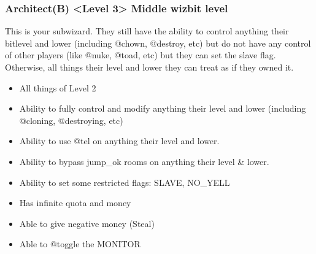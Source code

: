 \documentclass[letterpaper,10pt,english]{sphinxmanual}
\begin{document}
\subsubsection{Architect(B) \textless{}Level 3\textgreater{} \sphinxhyphen{} Middle wizbit level}
\label{\detokenize{toggles:architect-b-level-3-middle-wizbit-level}}
\sphinxAtStartPar
This is your sub\sphinxhyphen{}wizard.  They still have the ability to control
anything their bitlevel and lower (including @chown, @destroy, etc)
but do not have any control of other players (like @nuke, @toad, etc)
but they can set the slave flag.  Otherwise, all things their level
and lower they can treat as if they owned it.
\begin{itemize}
\item {} 
\sphinxAtStartPar
All things of Level 2

\item {} 
\sphinxAtStartPar
Ability to fully control and modify anything their level and lower (including @cloning, @destroying, etc)

\item {} 
\sphinxAtStartPar
Ability to use @tel on anything their level and lower.

\item {} 
\sphinxAtStartPar
Ability to bypass jump\_ok rooms on anything their level \& lower.

\item {} 
\sphinxAtStartPar
Ability to set some restricted flags: SLAVE, NO\_YELL

\item {} 
\sphinxAtStartPar
Has infinite quota and money

\item {} 
\sphinxAtStartPar
Able to give negative money (Steal)

\item {} 
\sphinxAtStartPar
Able to @toggle the MONITOR

\end{itemize}
\end{document}
